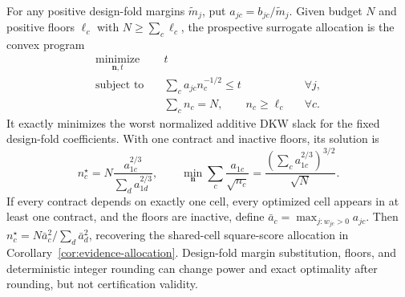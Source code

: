 \begin{theorem}
For any positive design-fold margins $\widetilde m_j$, put
$a_{jc}=b_{jc}/\widetilde m_j$. Given budget $N$ and positive floors $\ell_c$
with $N\geq\sum_c\ell_c$,
the prospective surrogate allocation is the convex program
\begin{equation}
 \begin{aligned}
  \underset{\boldsymbol n,t}{\operatorname{minimize}}\quad &t\\
  \text{subject to}\quad
  &\sum_c a_{jc}n_c^{-1/2}\leq t &&\forall j,\\
  &\sum_c n_c=N,\qquad n_c\geq\ell_c &&\forall c.
 \end{aligned}
 \label{eq:additive-allocation}
\end{equation}
It exactly minimizes the worst normalized additive DKW slack for the fixed
design-fold coefficients. With one contract and inactive floors, its solution is
\begin{equation}
 n_c^\star=N\frac{a_{1c}^{2/3}}{\sum_d a_{1d}^{2/3}},
 \qquad
 \min_{\boldsymbol n}\sum_c\frac{a_{1c}}{\sqrt{n_c}}
 =\frac{(\sum_c a_{1c}^{2/3})^{3/2}}{\sqrt N}.
 \label{eq:additive-single-contract}
\end{equation}
If every contract depends on exactly one cell, every optimized cell appears in
at least one contract, and the floors are inactive, define
$\bar a_c=\max_{j:w_{jc}>0}a_{jc}$. Then
$n_c^\star=N\bar a_c^2/\sum_d\bar a_d^2$, recovering the shared-cell
square-score allocation in Corollary~\ref{cor:evidence-allocation}. Design-fold
margin substitution, floors, and deterministic integer rounding can change
power and exact optimality after rounding, but not certification validity.
\end{theorem}

